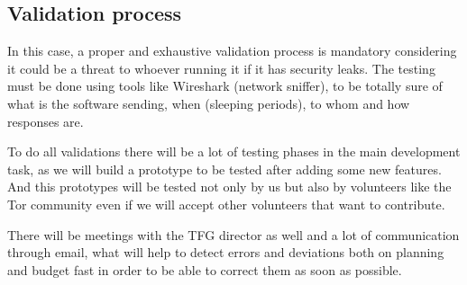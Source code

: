 \subsection{Validation process}
In this case, a proper and exhaustive validation process is mandatory considering it could be a threat to whoever running it if it has security leaks. The testing must be done using tools like Wireshark (network sniffer), to be totally sure of what is the software sending, when (sleeping periods), to whom and how responses are.

To do all validations there will be a lot of testing phases in the main development task, as we will build a prototype to be tested after adding some new features. And this prototypes will be tested not only by us but also by volunteers like the Tor community even if we will accept other volunteers that want to contribute.

There will be meetings with the TFG director as well and a lot of communication through email, what will help to detect errors and deviations both on planning and budget fast in order to be able to correct them as soon as possible.